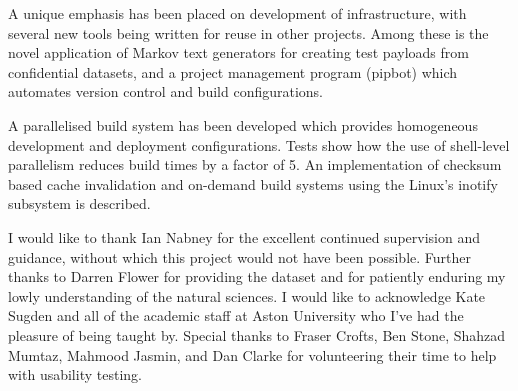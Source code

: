 A unique emphasis has been placed on development of infrastructure,
with several new tools being written for reuse in other
projects. Among these is the novel application of Markov text
generators for creating test payloads from confidential datasets, and
a project management program (pipbot) which automates version control
and build configurations.

A parallelised build system has been developed which provides
homogeneous development and deployment configurations. Tests show how
the use of shell-level parallelism reduces build times by a factor of
5. An implementation of checksum based cache invalidation and
on-demand build systems using the Linux's inotify subsystem is
described.




I would like to thank Ian Nabney for the excellent continued
supervision and guidance, without which this project would not have
been possible. Further thanks to Darren Flower for providing the
dataset and for patiently enduring my lowly understanding of the
natural sciences. I would like to acknowledge Kate Sugden and all of
the academic staff at Aston University who I've had the pleasure of
being taught by. Special thanks to Fraser Crofts, Ben Stone, Shahzad
Mumtaz, Mahmood Jasmin, and Dan Clarke for volunteering their time to
help with usability testing.
